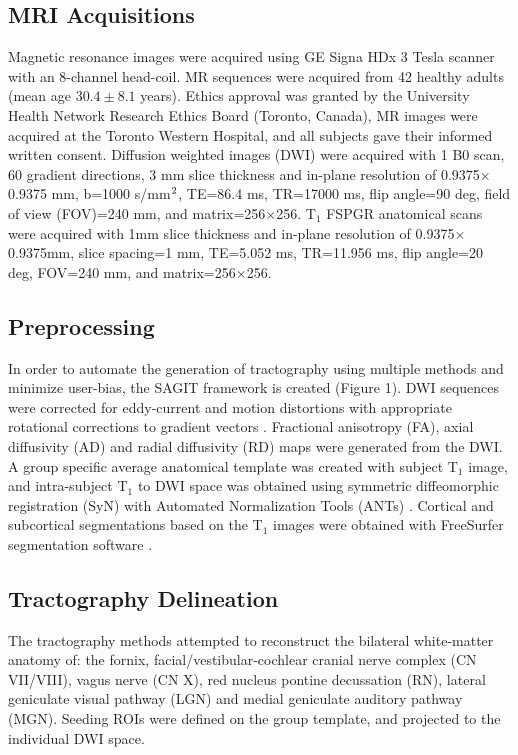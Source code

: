 \subsection{MRI Acquisitions}
Magnetic resonance images were acquired using GE Signa HDx 3 Tesla scanner with an 8-channel head-coil. MR sequences were acquired from 42 healthy adults (mean age $30.4\pm8.1$ years). Ethics approval was granted by the University Health Network Research Ethics Board (Toronto, Canada), MR images were acquired at the Toronto Western Hospital, and all subjects gave their informed written consent. Diffusion weighted images (DWI) were acquired with 1 B0 scan, 60 gradient directions, 3 mm slice thickness and in-plane resolution of 0.9375$\times$0.9375 mm, b=1000 s/mm$\textsuperscript{2}$, TE=86.4 ms, TR=17000 ms, flip angle=90 deg, field of view (FOV)=240 mm, and matrix=256$\times$256. T$_1$ FSPGR anatomical scans were acquired with 1mm slice thickness and in-plane resolution of 0.9375$\times$0.9375mm, slice spacing=1 mm, TE=5.052 ms, TR=11.956 ms, flip angle=20 deg, FOV=240 mm, and matrix=256$\times$256.

\subsection{Preprocessing}
In order to automate the generation of tractography using multiple methods and minimize user-bias, the SAGIT framework is created (Figure 1). DWI sequences were corrected for eddy-current and motion distortions with appropriate rotational corrections to gradient vectors \cite{Leemans2009}. Fractional anisotropy (FA), axial diffusivity (AD) and radial diffusivity (RD) maps were generated from the DWI. A group specific average anatomical template was created with subject T$_1$ image, and intra-subject T$_1$ to DWI space was obtained using symmetric diffeomorphic registration (SyN) with Automated Normalization Tools (ANTs) \cite{Avants2008b}. Cortical and subcortical segmentations based on the T$_1$ images were obtained with FreeSurfer segmentation software \cite{Fischl2002b}. 

\subsection{Tractography Delineation}
The tractography methods attempted to reconstruct the bilateral white-matter anatomy of: the fornix, facial/vestibular-cochlear cranial nerve complex (CN VII/VIII), vagus nerve (CN X), red nucleus pontine decussation (RN), lateral geniculate visual pathway (LGN) and medial geniculate auditory pathway (MGN). Seeding ROIs were defined on the group template, and projected to the individual DWI space. 

